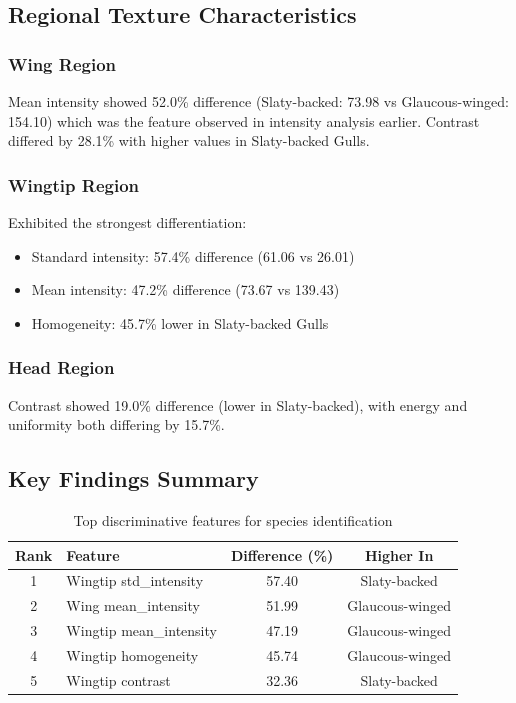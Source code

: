 \documentclass[a4paper,12pt]{report}
\begin{document}
\subsection{Regional Texture Characteristics}

\subsubsection*{Wing Region}
Mean intensity showed 52.0\% difference (Slaty-backed: 73.98 vs Glaucous-winged: 154.10) which was the feature observed in intensity analysis earlier. Contrast differed by 28.1\% with higher values in Slaty-backed Gulls.

\subsubsection*{Wingtip Region}
Exhibited the strongest differentiation:
\begin{itemize}
    \item Standard intensity: 57.4\% difference (61.06 vs 26.01)
    \item Mean intensity: 47.2\% difference (73.67 vs 139.43)
    \item Homogeneity: 45.7\% lower in Slaty-backed Gulls
\end{itemize}

\subsubsection*{Head Region}
Contrast showed 19.0\% difference (lower in Slaty-backed), with energy and uniformity both differing by 15.7\%.

\subsection{Key Findings Summary}
\begin{table}[htbp]
    \centering
    \begin{tabular}{clcc}
        \hline
        Rank & Feature & Difference (\%) & Higher In \\
        \hline
        1 & Wingtip std\_intensity & 57.40 & Slaty-backed \\
        2 & Wing mean\_intensity & 51.99 & Glaucous-winged \\
        3 & Wingtip mean\_intensity & 47.19 & Glaucous-winged \\
        4 & Wingtip homogeneity & 45.74 & Glaucous-winged \\
        5 & Wingtip contrast & 32.36 & Slaty-backed \\
        \hline
    \end{tabular}
    \caption{Top discriminative features for species identification}
    \label{tab:top_features}
\end{table}
\end{document}
